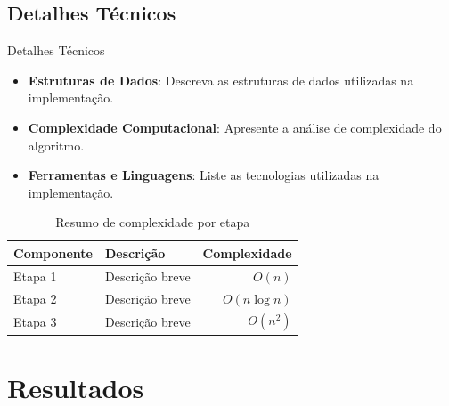 \subsection{Detalhes Técnicos}
\begin{frame}{Detalhes Técnicos}
  \small
  \begin{itemize}
    \setlength{\itemsep}{10pt}
    \item \textbf{Estruturas de Dados}: Descreva as estruturas de dados utilizadas na implementação.
    \item \textbf{Complexidade Computacional}: Apresente a análise de complexidade do algoritmo.
    \item \textbf{Ferramentas e Linguagens}: Liste as tecnologias utilizadas na implementação.
  \end{itemize}
  
  \begin{table}[h]
    \centering
    \small
    \begin{tabular}{llr}
      \toprule
      \textbf{Componente} & \textbf{Descrição} & \textbf{Complexidade} \\
      \midrule
      Etapa 1 & Descrição breve & $O(n)$ \\
      Etapa 2 & Descrição breve & $O(n \log n)$ \\
      Etapa 3 & Descrição breve & $O(n^2)$ \\
      \bottomrule
    \end{tabular}
    \caption{Resumo de complexidade por etapa}
  \end{table}
\end{frame}


\section{Resultados}

